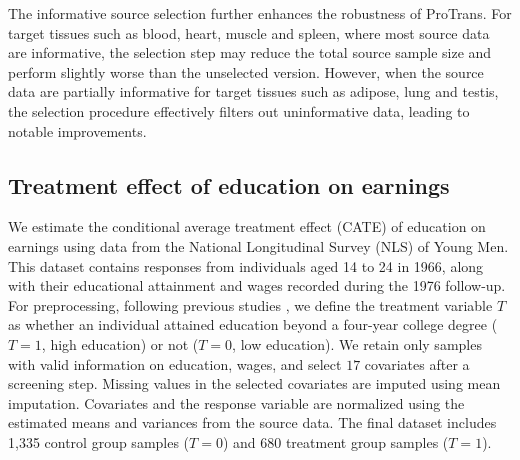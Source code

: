 \documentclass[12pt]{article}
\begin{document}
The informative source selection further enhances the robustness of ProTrans. For target tissues such as blood, heart, muscle and spleen, where most source data are informative, the selection step may reduce the total source sample size and perform slightly worse than the unselected version. However, when the source data are partially informative for target tissues such as adipose, lung and testis, the selection procedure effectively filters out uninformative data, leading to notable improvements.





\subsection{Treatment effect of education on earnings}
We estimate the conditional average treatment effect (CATE) of education on earnings using data from the National Longitudinal Survey (NLS) of Young Men. This dataset contains responses from individuals aged 14 to 24 in 1966, along with their educational attainment and wages recorded during the 1976 follow-up. For preprocessing, following previous studies \citep{wang2018bounded,sun2022high}, we define the treatment variable $T$ as whether an individual attained education beyond a four-year college degree ($T=1$, high education) or not ($T=0$, low education). We retain only samples with valid information on education, wages, and select $17$ covariates after a screening step. Missing values in the selected covariates are imputed using mean imputation. Covariates and the response variable are normalized using the estimated means and variances from the source data. The final dataset includes 1,335 control group samples ($T=0$) and 680 treatment group samples ($T=1$).

\end{document}
